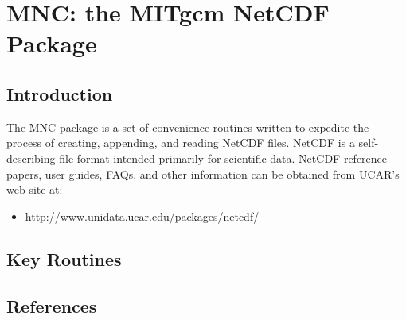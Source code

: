 


\section{MNC: the MITgcm NetCDF Package}
\label{sec:pkg:mnc}

\subsection{Introduction}

The MNC package is a set of convenience routines written to expedite
the process of creating, appending, and reading NetCDF files.  NetCDF
is a self-describing file format \cite{rew:97} intended primarily for
scientific data.  NetCDF reference papers, user guides, FAQs, and other
information can be obtained from UCAR's web site at:

\begin{itemize}
\item http://www.unidata.ucar.edu/packages/netcdf/
\end{itemize}




\subsection{Key Routines}



\subsection{References}
